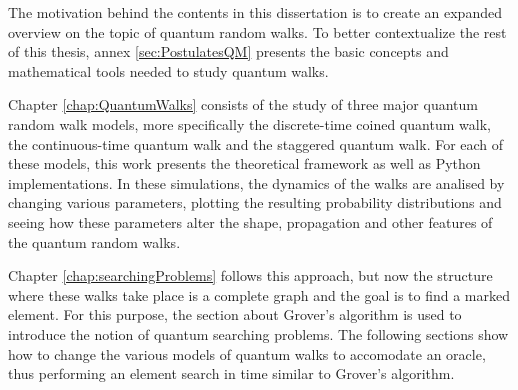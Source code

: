 \documentclass[../../dissertation.tex]{subfiles}
\begin{document}
The motivation behind the contents in this dissertation is to create an
expanded overview on  the topic of quantum random walks. To better
contextualize the rest of this thesis, annex \ref{sec:PostulatesQM} presents
the basic concepts and mathematical tools needed to study quantum walks. \par

Chapter \ref{chap:QuantumWalks} consists of the study of three major quantum
random walk models, more specifically the discrete-time coined quantum walk,
the continuous-time quantum walk and the staggered quantum walk. For each of
these models, this work presents the theoretical framework as well as Python
implementations. In these simulations, the dynamics of the walks are analised
by changing various parameters, plotting the resulting probability
distributions and seeing how these parameters alter the shape, propagation and
other features of the quantum random walks.\par

Chapter \ref{chap:searchingProblems} follows this approach, but now the
structure where these walks take place is a complete graph and the goal is to
find a marked element. For this purpose, the section about Grover's algorithm
is used to introduce the notion of quantum searching problems. The following
sections show how to change the various models of quantum walks to accomodate
an oracle, thus performing an element search in time similar to Grover's
algorithm. \par
\end{document}
